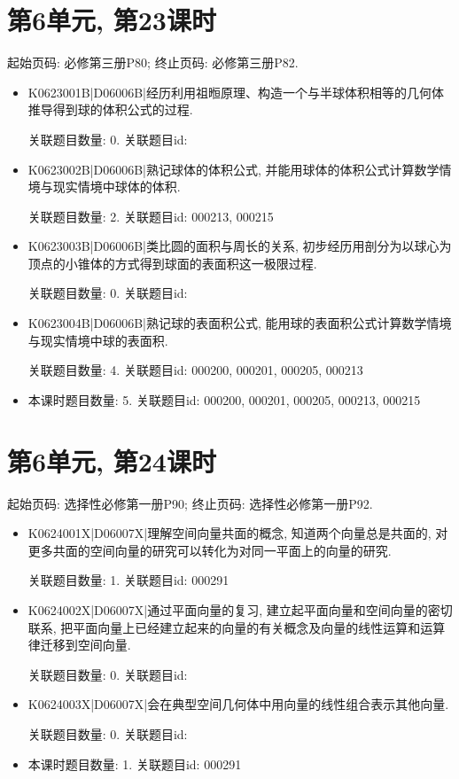 \section*{第6单元, 第23课时}
起始页码: 必修第三册P80; 终止页码: 必修第三册P82.
\begin{itemize}
\item K0623001B|D06006B|经历利用祖暅原理、构造一个与半球体积相等的几何体推导得到球的体积公式的过程.

关联题目数量: 0. 关联题目id: 

\item K0623002B|D06006B|熟记球体的体积公式, 并能用球体的体积公式计算数学情境与现实情境中球体的体积.

关联题目数量: 2. 关联题目id: 000213, 000215

\item K0623003B|D06006B|类比圆的面积与周长的关系, 初步经历用剖分为以球心为顶点的小锥体的方式得到球面的表面积这一极限过程.

关联题目数量: 0. 关联题目id: 

\item K0623004B|D06006B|熟记球的表面积公式, 能用球的表面积公式计算数学情境与现实情境中球的表面积.

关联题目数量: 4. 关联题目id: 000200, 000201, 000205, 000213

\item 本课时题目数量: 5. 关联题目id: 000200, 000201, 000205, 000213, 000215

\end{itemize}

\section*{第6单元, 第24课时}
起始页码: 选择性必修第一册P90; 终止页码: 选择性必修第一册P92.
\begin{itemize}
\item K0624001X|D06007X|理解空间向量共面的概念, 知道两个向量总是共面的, 对更多共面的空间向量的研究可以转化为对同一平面上的向量的研究.

关联题目数量: 1. 关联题目id: 000291

\item K0624002X|D06007X|通过平面向量的复习, 建立起平面向量和空间向量的密切联系, 把平面向量上已经建立起来的向量的有关概念及向量的线性运算和运算律迁移到空间向量.

关联题目数量: 0. 关联题目id: 

\item K0624003X|D06007X|会在典型空间几何体中用向量的线性组合表示其他向量.

关联题目数量: 0. 关联题目id: 

\item 本课时题目数量: 1. 关联题目id: 000291

\end{itemize}


